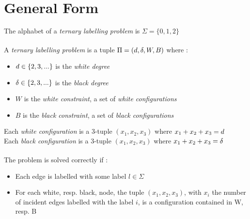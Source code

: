 \section{General Form}\label{section:general}
The alphabet of a \textit{ternary labelling problem} is $\Sigma = \{0,1,2\}$\\\\
A \textit{ternary labelling problem} is a tuple $\Pi = (d,\delta,W,B)$ where :
\begin{itemize}
    \item $d\in\{2,3,...\}$ is the \textit{white degree}
    \item $\delta\in\{2,3,...\}$ is the \textit{black degree}
    \item $W$ is the \textit{white constraint}, a set of \textit{white configurations}
    \item $B$ is the \textit{black constraint}, a set of \textit{black configurations}
\end{itemize}
Each \textit{white configuration} is a 3-tuple $(x_1,x_2,x_3)$ where $x_1+x_2+x_3 = d$\\
Each \textit{black configuration} is a 3-tuple $(x_1,x_2,x_3)$ where $x_1+x_2+x_3 = \delta$\\\\
The problem is solved correctly if :
\begin{itemize}
    \item Each edge is labelled with some label $l\in\Sigma$
    \item For each white, resp. black, node, the tuple $(x_1,x_2, x_3)$, with $x_i$ the number of incident edges labelled with the label $i$, is a configuration contained in W, resp. B
\end{itemize}

